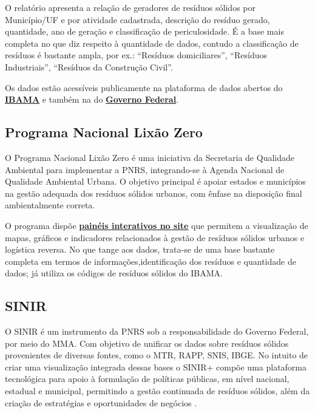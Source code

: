 O relatório apresenta a relação de geradores de resíduos sólidos por Município/UF e por atividade cadastrada, descrição do resíduo gerado, quantidade, ano de geração e classificação de periculosidade. É a base mais completa no que diz respeito à quantidade de dados, contudo a classificação de resíduos é bastante ampla, por ex.: “Resíduos domiciliares”, “Resíduos Industriais”, “Resíduos da Construção Civil”.

Os dados estão acessíveis publicamente na plataforma de dados abertos do \href{https://dadosabertos.ibama.gov.br/organization/ibama?q=res%C3%ADduos&sort=score+desc%2C+metadata_modified+desc}{\textbf{IBAMA}} e também na do \href{https://dados.gov.br/dados/busca?termo=res%25C3%25ADduos%2520s%25C3%25B3lidos}{\textbf{Governo Federal}}.


\subsection{Programa Nacional Lixão Zero}


O Programa Nacional Lixão Zero é uma iniciativa da Secretaria de Qualidade Ambiental para implementar a \gls{PNRS}, integrando-se à Agenda Nacional de Qualidade Ambiental Urbana. O objetivo principal é apoiar estados e municípios na gestão adequada dos resíduos sólidos urbanos, com ênfase na disposição final ambientalmente correta. \cite{mma_programa_2019}

O programa dispõe \href{https://www.gov.br/mma/pt-br/acesso-a-informacao/acoes-e-programas/agendaambientalurbana/lixao-zero/Painel}{\textbf{painéis interativos no site}} que permitem a visualização de mapas, gráficos e indicadores relacionados à gestão de resíduos sólidos urbanos e logística reversa. No que tange aos dados, trata-se de uma base bastante completa em termos de informações,identificação dos resíduos e quantidade de dados; já utiliza os códigos de resíduos sólidos do \gls{IBAMA}.


\subsection{SINIR}

O \gls{SINIR} é um instrumento da \gls{PNRS} sob a responsabilidade do Governo Federal, por meio do \gls{MMA}. Com objetivo de unificar os dados sobre resíduos sólidos provenientes de diversas fontes, como o \gls{MTR}, \gls{RAPP}, \gls{SNIS}, \gls{IBGE}. No intuito de criar uma visualização integrada dessas bases o \gls{SINIR}+ compõe uma plataforma tecnológica para apoio à formulação de políticas públicas, em nível nacional, estadual e municipal, permitindo a gestão continuada de resíduos sólidos, além da criação de estratégias e oportunidades de negócios \cite{sinir_sinir_nodate}.

